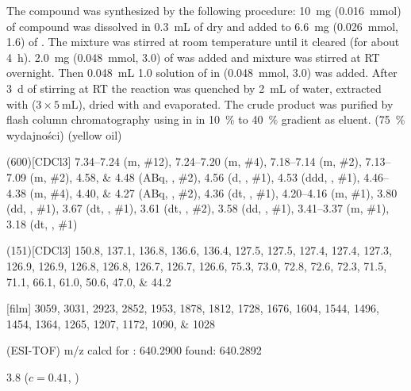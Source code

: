 The compound was synthesized by the following procedure:
\SI{10}{\milli\gram} (\SI{0.016}{\milli\mol}) of compound  was dissolved in \SI{0.3}{\milli\liter} of dry  and added to \SI{6.6}{\milli\gram} (\SI{0.026}{\milli\mol}, \SI{1.6}{\equiv}) of .
The mixture was stirred at room temperature until it cleared (for about \SI{4}{\hour}).
\SI{2.0}{\milli\gram} (\SI{0.048}{\milli\mol}, \SI{3.0}{\equiv}) of  was added and mixture was stirred at RT overnight.
Then \SI{0.048}{\milli\liter} \SI{1.0}{\Molar} solution of  in  (\SI{0.048}{\milli\mol}, \SI{3.0}{\equiv}) was added.
After \SI{3}{\day} of stirring at RT the reaction was quenched by \SI{2}{\milli\liter} of water, extracted with  ($3 \times \SI{5}{\milli\liter}$), dried with  and evaporated.
The crude product was purified by flash column chromatography using  in  in \SI{10}{\percent} to \SI{40}{\percent} gradient as eluent.
(\SI{75}{\percent} wydajności) (yellow oil)
\begin{fullexp}
	\NMR(600)[CDCl3] \numrange{7.34}{7.24} (m, \#{12}), \numrange{7.24}{7.20} (m, \#{4}), \numrange{7.18}{7.14} (m, \#{2}), \numrange{7.13}{7.09} (m, \#{2}), \numlist{4.58;4.48} (ABq, , \#{2}), \num{4.56} (d, , \#{1}), \num{4.53} (ddd, , \#{1}), \numrange{4.46}{4.38} (m, \#{4}), \numlist{4.40;4.27} (ABq, , \#{2}), \num{4.36} (dt, , \#{1}), \numrange{4.20}{4.16} (m, \#{1}), \num{3.80} (dd, , \#{1}), \num{3.67} (dt, , \#{1}), \num{3.61} (dt, , \#{2}), \num{3.58} (dd, , \#{1}), \numrange{3.41}{3.37} (m, \#{1}), \num{3.18} (dt, , \#{1})\par\noindent
	(151)[CDCl3] \numlist{150.8; 137.1; 136.8; 136.6; 136.4; 127.5; 127.5; 127.4; 127.4; 127.3; 126.9; 126.9; 126.8; 126.8; 126.7; 126.7; 126.6; 75.3; 73.0; 72.8; 72.6; 72.3; 71.5; 71.1; 66.1; 61.0; 50.6; 47.0; 44.2}\par\noindent
	[film] \numlist{3059; 3031; 2923; 2852; 1953; 1878; 1812; 1728; 1676; 1604; 1544; 1496; 1454; 1364; 1265; 1207; 1172; 1090; 1028}\par\noindent
	 (ESI-TOF) m/z calcd for : \num{640.2900} found: \num{640.2892}\par\noindent
	\data{[$\alpha^{23}_D$]~$=$} \num{3.8} ($c = 0.41$, )
\end{fullexp}

